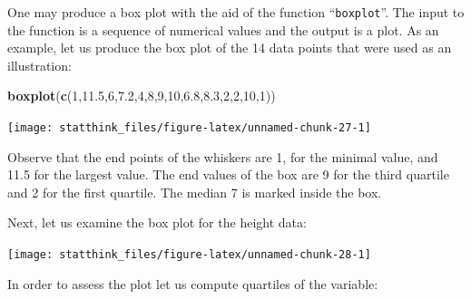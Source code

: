 \documentclass[
]{krantz}
\makeatletter
\newenvironment{Shaded}{\begin{snugshade}}{\end{snugshade}}
\newcommand{\DecValTok}[1]{\textcolor[rgb]{0.00,0.00,0.81}{#1}}
\newcommand{\FloatTok}[1]{\textcolor[rgb]{0.00,0.00,0.81}{#1}}
\newcommand{\KeywordTok}[1]{\textcolor[rgb]{0.13,0.29,0.53}{\textbf{#1}}}
\newcommand{\NormalTok}[1]{#1}
\newcommand{\OperatorTok}[1]{\textcolor[rgb]{0.81,0.36,0.00}{\textbf{#1}}}
\newenvironment{kframe}{%
\medskip{}
\setlength{\fboxsep}{.8em}
 \def\at@end@of@kframe{}%
 \ifinner\ifhmode%
  \def\at@end@of@kframe{\end{minipage}}%
  \begin{minipage}{\columnwidth}%
 \fi\fi%
 \def\FrameCommand##1{\hskip\@totalleftmargin \hskip-\fboxsep
 \colorbox{shadecolor}{##1}\hskip-\fboxsep
     \hskip-\linewidth \hskip-\@totalleftmargin \hskip\columnwidth}%
 \MakeFramed {\advance\hsize-\width
   \@totalleftmargin\z@ \linewidth\hsize
   \@setminipage}}%
 {\par\unskip\endMakeFramed%
 \at@end@of@kframe}
\renewenvironment{Shaded}{\begin{kframe}}{\end{kframe}}
\theoremstyle{definition}
\theoremstyle{definition}
\theoremstyle{definition}
\theoremstyle{remark}
\makeatother
\begin{document}
One may produce a box plot with the aid of the function ``\texttt{boxplot}''. The
input to the function is a sequence of numerical values and the output
is a plot. As an example, let us produce the box plot of the 14 data
points that were used as an illustration:

\begin{Shaded}
\begin{Highlighting}[]
\KeywordTok{boxplot}\NormalTok{(}\KeywordTok{c}\NormalTok{(}\DecValTok{1}\NormalTok{,}\FloatTok{11.5}\NormalTok{,}\DecValTok{6}\NormalTok{,}\FloatTok{7.2}\NormalTok{,}\DecValTok{4}\NormalTok{,}\DecValTok{8}\NormalTok{,}\DecValTok{9}\NormalTok{,}\DecValTok{10}\NormalTok{,}\FloatTok{6.8}\NormalTok{,}\FloatTok{8.3}\NormalTok{,}\DecValTok{2}\NormalTok{,}\DecValTok{2}\NormalTok{,}\DecValTok{10}\NormalTok{,}\DecValTok{1}\NormalTok{))}
\end{Highlighting}
\end{Shaded}

\begin{center}\texttt{[image: statthink\_files/figure-latex/unnamed-chunk-27-1]} \end{center}

Observe that the end points of the
whiskers are 1, for the minimal value, and 11.5 for the largest value.
The end values of the box are 9 for the third quartile and 2 for the
first quartile. The median 7 is marked inside the box.

Next, let us examine the box plot for the height data:

\begin{Shaded}
\end{Shaded}

\begin{center}\texttt{[image: statthink\_files/figure-latex/unnamed-chunk-28-1]} \end{center}

In order to assess the plot let us compute quartiles of the variable:

\begin{Shaded}
\end{Shaded}
\end{document}
